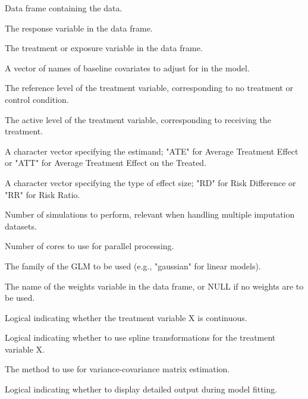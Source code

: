 \documentclass[a4paper]{book}
\begin{document}
\begin{Arguments}
\begin{ldescription}
\item[\code{df}] Data frame containing the data.

\item[\code{Y}] The response variable in the data frame.

\item[\code{X}] The treatment or exposure variable in the data frame.

\item[\code{baseline\_vars}] A vector of names of baseline covariates to adjust for in the model.

\item[\code{treat\_0}] The reference level of the treatment variable, corresponding to no treatment or control condition.

\item[\code{treat\_1}] The active level of the treatment variable, corresponding to receiving the treatment.

\item[\code{estimand}] A character vector specifying the estimand; "ATE" for Average Treatment Effect or "ATT" for Average Treatment Effect on the Treated.

\item[\code{type}] A character vector specifying the type of effect size; "RD" for Risk Difference or "RR" for Risk Ratio.

\item[\code{nsims}] Number of simulations to perform, relevant when handling multiple imputation datasets.

\item[\code{cores}] Number of cores to use for parallel processing.

\item[\code{family}] The family of the GLM to be used (e.g., "gaussian" for linear models).

\item[\code{weights}] The name of the weights variable in the data frame, or NULL if no weights are to be used.

\item[\code{continuous\_X}] Logical indicating whether the treatment variable X is continuous.

\item[\code{splines}] Logical indicating whether to use spline transformations for the treatment variable X.

\item[\code{vcov}] The method to use for variance-covariance matrix estimation.

\item[\code{verbose}] Logical indicating whether to display detailed output during model fitting.
\end{ldescription}
\end{Arguments}
\end{document}
